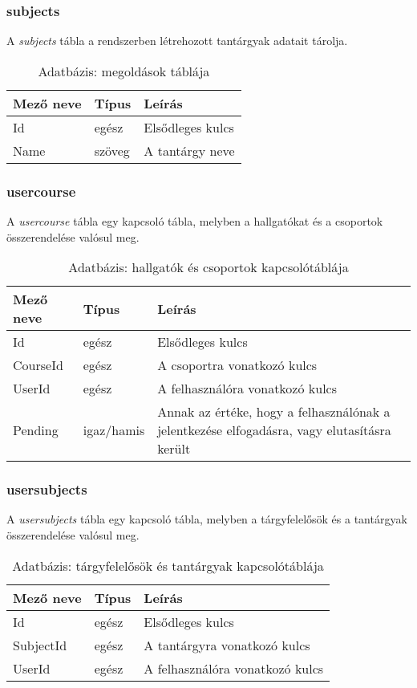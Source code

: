 \subsubsection{subjects}
A \emph{subjects} tábla a rendszerben létrehozott tantárgyak adatait tárolja.
\begin{table}[H]
	\centering
	\begin{tabular}{ | m{} | m{} | m{} | }
		\hline
		\textbf{Mező neve} & \textbf{Típus} & \textbf{Leírás} \\
		\hline \hline
		Id & egész & Elsődleges kulcs \\
		\hline
		Name & szöveg & A tantárgy neve\\
		\hline
	\end{tabular}
	\caption{Adatbázis: megoldások táblája}
	\label{tab:db-subjects}
\end{table}
\subsubsection{usercourse}
A \emph{usercourse} tábla egy kapcsoló tábla, melyben a hallgatókat és a csoportok összerendelése valósul meg.
\begin{table}[H]
	\centering
	\begin{tabular}{ | m{} | m{} | m{} | }
		\hline
		\textbf{Mező neve} & \textbf{Típus} & \textbf{Leírás} \\
		\hline \hline
		Id & egész & Elsődleges kulcs \\
		\hline
		CourseId & egész & A csoportra vonatkozó kulcs\\
		\hline
		UserId & egész & A felhasználóra vonatkozó kulcs\\
		\hline
		Pending & igaz/hamis & Annak az értéke, hogy a felhasználónak a jelentkezése elfogadásra, vagy elutasításra került \\
		\hline
	\end{tabular}
	\caption{Adatbázis: hallgatók és csoportok kapcsolótáblája}
	\label{tab:db-usercourse}
\end{table}
\subsubsection{usersubjects}
A \emph{usersubjects} tábla egy kapcsoló tábla, melyben a tárgyfelelősök és a tantárgyak összerendelése valósul meg.
\begin{table}[H]
	\centering
	\begin{tabular}{ | m{} | m{} | m{} | }
		\hline
		\textbf{Mező neve} & \textbf{Típus} & \textbf{Leírás} \\
		\hline \hline
		Id & egész & Elsődleges kulcs \\
		\hline
		SubjectId & egész & A tantárgyra vonatkozó kulcs\\
		\hline
		UserId & egész & A felhasználóra vonatkozó kulcs\\
		\hline
	\end{tabular}
	\caption{Adatbázis: tárgyfelelősök és tantárgyak kapcsolótáblája}
	\label{tab:db-usersubjects}
\end{table}
